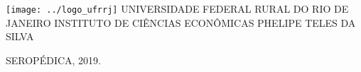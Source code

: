 \documentclass[a4paper,
               article,
               12pt,
               openany,
               oneside,
               english,
               brazil]{abntex2}
\numberwithin{equation}{section}
\begin{document}
\renewcommand{\imprimircapa}{%
    \begin{capa}%
        \center
        \texttt{[image: ../logo\_ufrrj]}
        \ABNTEXchapterfont
        \large UNIVERSIDADE FEDERAL RURAL DO RIO DE JANEIRO
        \large INSTITUTO DE CIÊNCIAS ECONÔMICAS
        \large PHELIPE TELES DA SILVA
        \vfill
        \begin{center}
            \ABNTEXchapterfont
            \bfseries
            \large \imprimirtitulo
        \end{center}
        \vfill
        \large SEROPÉDICA, 2019.
        \vspace*{1cm}
    \end{capa}}
\imprimircapa


\imprimirfolhaderosto



\tableofcontents*
\clearpage
\end{document}
